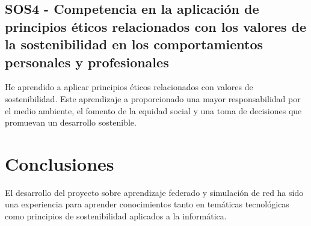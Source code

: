 \subsection{SOS4 - Competencia en la aplicación de principios éticos relacionados con los valores de la sostenibilidad en los comportamientos personales y profesionales}
\label{subsec:SOS4}
He aprendido a aplicar principios éticos relacionados con valores de sostenibilidad. Este aprendizaje a proporcionado una mayor responsabilidad por el medio ambiente, el fomento de la equidad social y una toma de decisiones que promuevan un desarrollo sostenible.

\section{Conclusiones}
\label{sec:Conclusiones}
El desarrollo del proyecto sobre aprendizaje federado y simulación de red ha sido una experiencia para aprender conocimientos tanto en temáticas tecnológicas como principios de sostenibilidad aplicados a la informática.
